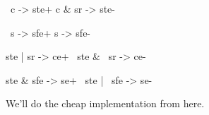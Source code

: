 \documentclass{article}
\begin{document}
\begin{prs2}
~c -> ste+
c & sr -> ste-

~s -> sfe+
s -> sfe-
\end{prs2}

\begin{prs2}
ste | sr -> ce+
~ste & ~sr -> ce-
\end{prs2}

\begin{prs2}
ste & sfe -> se+
~ste | ~sfe -> se-
\end{prs2}

\noindent
We'll do the cheap implementation from here.

\end{document}
